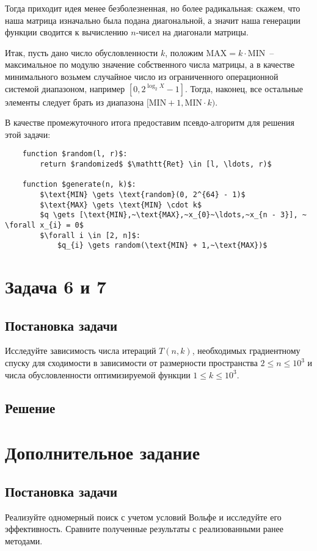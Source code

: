 \documentclass[12pt, a4paper, oneside]{article}
\begin{document}
	Тогда приходит идея менее безболезненная, но более радикальная: скажем, что наша матрица изначально была подана диагональной, а значит наша генерации функции сводится к вычислению $n$-чисел на диагонали матрицы.

	Итак, пусть дано число обусловленности $k$, положим $\text{MAX} = k \cdot \text{MIN}$~-- максимальное по модулю значение собственного числа матрицы, а в качестве минимального возьмем случайное число из ограниченного операционной системой диапазоном, например $[0, 2^{\log_{2}{X}} - 1]$. Тогда, наконец, все остальные элементы следует брать из диапазона $[\text{MIN} + 1, \text{MIN} \cdot k)$.

	В качестве промежуточного итога предоставим псевдо-алгоритм для решения этой задачи:
	\begin{lstlisting}
	function $random(l, r)$:
		return $randomized$ $\mathtt{Ret} \in [l, \ldots, r)$
			
	function $generate(n, k)$:
		$\text{MIN} \gets \text{random}(0, 2^{64} - 1)$
		$\text{MAX} \gets \text{MIN} \cdot k$
		$q \gets [\text{MIN},~\text{MAX},~x_{0}~\ldots,~x_{n - 3}], ~ \forall x_{i} = 0$
		$\forall i \in [2, n]$:
			$q_{i} \gets random(\text{MIN} + 1,~\text{MAX})$
	\end{lstlisting}
	\section*{Задача 6 и 7}
	\subsection*{Постановка задачи}
	Исследуйте зависимость числа итераций $T(n, k)$, необходимых градиентному спуску для сходимости в зависимости от размерности пространства $2 \leqslant n \leqslant 10^{3}$ и числа обусловленности оптимизируемой функции $1 \leqslant k \leqslant 10^{3}$.
	\subsection*{Решение}
	\section*{Дополнительное задание}
	\subsection*{Постановка задачи}
	Реализуйте одномерный поиск с учетом условий Вольфе и исследуйте его эффективность. Сравните полученные результаты с реализованными ранее методами.
\end{document}
